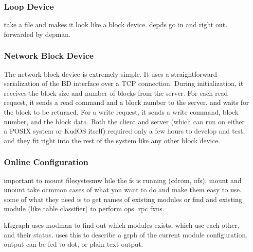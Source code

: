 \subsubsection{Loop Device}
\label{sec:solution:impl:loop}

take a file and makes it look like a block device. depds go in and
right out. forwarded by depman.

\subsubsection{Network Block Device}

The network block device is extremely simple. It uses a straightforward
serialization of the BD interface over a TCP connection. During initialization,
it receives the block size and number of blocks from the server. For each read
request, it sends a read command and a block number to the server, and waits for
the block to be returned. For a write request, it sends a write command, block
number, and the block data. Both the client and server (which can run on either
a POSIX system or KudOS itself) required only a few hours to develop and test,
and they fit right into the rest of the system like any other block device.

\subsubsection{Online Configuration}
\label{sec:solution:impl:online}


important to mount filesystesmw hile the fs is running (cdrom,
nfs). mount and unount take ocmmon cases of what you want to do and
make them easy to use. some of what they need is to get names of
existing modules or find and existing module (like table classifier)
to perform ops. rpc fxns.

kfsgraph uses modman to find out which modules exists, which use each
other, and their status. uses this to describe a grph of the current
module configuration. output can be fed to dot, or plain text output.
